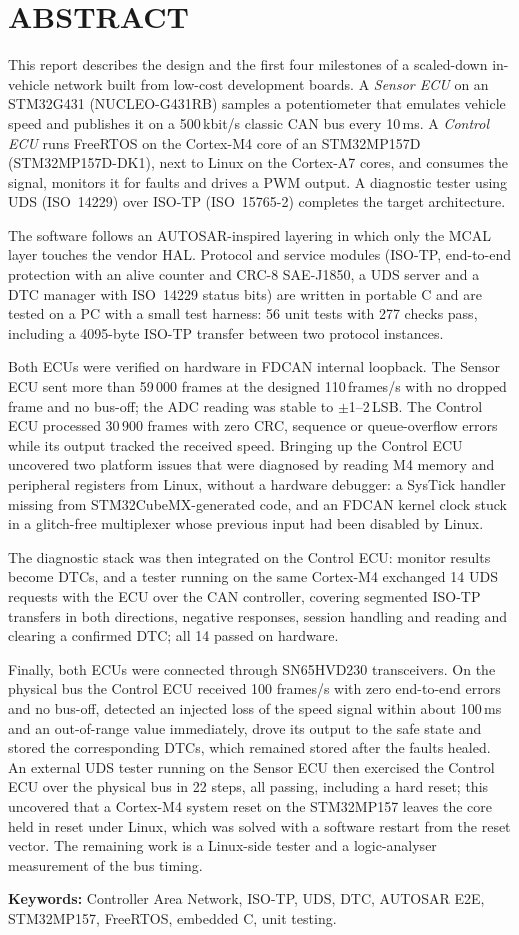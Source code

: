 \chapter*{ABSTRACT}

This report describes the design and the first four milestones of a scaled-down in-vehicle network built from low-cost development boards. A \textit{Sensor ECU} on an STM32G431 (NUCLEO-G431RB) samples a potentiometer that emulates vehicle speed and publishes it on a 500\,kbit/s classic CAN bus every 10\,ms. A \textit{Control ECU} runs FreeRTOS on the Cortex-M4 core of an STM32MP157D (STM32MP157D-DK1), next to Linux on the Cortex-A7 cores, and consumes the signal, monitors it for faults and drives a PWM output. A diagnostic tester using UDS (ISO~14229) over ISO-TP (ISO~15765-2) completes the target architecture.

The software follows an AUTOSAR-inspired layering in which only the MCAL layer touches the vendor HAL. Protocol and service modules (ISO-TP, end-to-end protection with an alive counter and CRC-8 SAE-J1850, a UDS server and a DTC manager with ISO~14229 status bits) are written in portable C and are tested on a PC with a small test harness: 56 unit tests with 277 checks pass, including a 4095-byte ISO-TP transfer between two protocol instances.

Both ECUs were verified on hardware in FDCAN internal loopback. The Sensor ECU sent more than 59\,000 frames at the designed 110\,frames/s with no dropped frame and no bus-off; the ADC reading was stable to $\pm$1--2\,LSB. The Control ECU processed 30\,900 frames with zero CRC, sequence or queue-overflow errors while its output tracked the received speed. Bringing up the Control ECU uncovered two platform issues that were diagnosed by reading M4 memory and peripheral registers from Linux, without a hardware debugger: a SysTick handler missing from STM32CubeMX-generated code, and an FDCAN kernel clock stuck in a glitch-free multiplexer whose previous input had been disabled by Linux.

The diagnostic stack was then integrated on the Control ECU: monitor results become DTCs, and a tester running on the same Cortex-M4 exchanged 14 UDS requests with the ECU over the CAN controller, covering segmented ISO-TP transfers in both directions, negative responses, session handling and reading and clearing a confirmed DTC; all 14 passed on hardware.

Finally, both ECUs were connected through SN65HVD230 transceivers. On the physical bus the Control ECU received 100 frames/s with zero end-to-end errors and no bus-off, detected an injected loss of the speed signal within about 100\,ms and an out-of-range value immediately, drove its output to the safe state and stored the corresponding DTCs, which remained stored after the faults healed. An external UDS tester running on the Sensor ECU then exercised the Control ECU over the physical bus in 22 steps, all passing, including a hard reset; this uncovered that a Cortex-M4 system reset on the STM32MP157 leaves the core held in reset under Linux, which was solved with a software restart from the reset vector. The remaining work is a Linux-side tester and a logic-analyser measurement of the bus timing.

\bigskip
\noindent\textbf{Keywords:} Controller Area Network, ISO-TP, UDS, DTC, AUTOSAR E2E, STM32MP157, FreeRTOS, embedded C, unit testing.
\newpage
